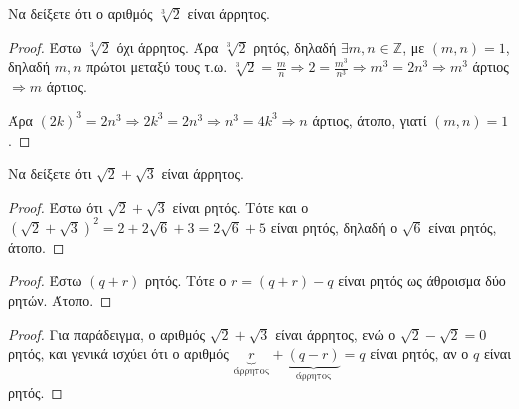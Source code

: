 \documentclass[main.tex]{subfiles}
\begin{document}

\begin{example}
  Να δείξετε ότι ο αριθμός $ \sqrt[3]{2} $ είναι άρρητος.
\end{example}

\begin{proof}
  Έστω $ \sqrt[3]{2} $ όχι άρρητος. Άρα $ \sqrt[3]{2} $ ρητός, δηλαδή $ \exists m,n 
  \in \mathbb{Z} $, με $ (m,n)=1 $, δηλαδή $ m,n $ πρώτοι μεταξύ τους
  τ.ω. $ \sqrt[3]{2} = \frac{m}{n} \Rightarrow 2 = \frac{m^{3}}{n^{3}} \Rightarrow 
  m^{3} = 2n^{3} \Rightarrow m^{3} $ άρτιος $ \Rightarrow m $ άρτιος. 

  Άρα $ (2k)^{3} = 2n^{3} \Rightarrow 2k^{3}=2n^{3} \Rightarrow n^{3} = 4k^{3} 
  \Rightarrow n $ άρτιος,  άτοπο, γιατί $ (m,n)=1 $.
\end{proof}

\begin{example}
  Να δείξετε ότι $ \sqrt{2} + \sqrt{3} $ είναι άρρητος.
\end{example}

\begin{proof}
  Έστω ότι $ \sqrt{2} + \sqrt{3} $ είναι ρητός. Τότε και ο $ (\sqrt{2} + \sqrt{3} )
  ^{2} = 2 + 2 \sqrt{6} + 3 = 2 \sqrt{6} + 5 $ είναι ρητός, δηλαδή ο $ \sqrt{6} $ 
  είναι ρητός, άτοπο.
\end{proof}


\begin{proof}
\item {}
  Έστω $(q+r)$ ρητός. Τότε ο $ r = (q+r)-q $ είναι ρητός ως άθροισμα δύο 
  ρητών. Άτοπο.
\end{proof}


\begin{proof}
  Για παράδειγμα, ο αριθμός $ \sqrt{2} + \sqrt{3} $ είναι άρρητος, ενώ ο 
  $ \sqrt{2} - \sqrt{2} = 0 $ ρητός, και γενικά ισχύει ότι ο αριθμός
  $ \underbrace{r}_{\text{άρρητος}}+ \underbrace{(q-r)}_{\text{άρρητος}} =q $ 
  είναι ρητός, αν ο $q$ είναι ρητός.
\end{proof}
\end{document}

